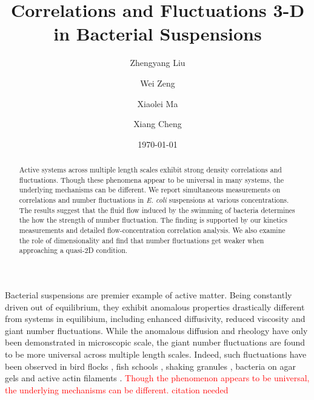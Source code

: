 \documentclass[twocolumn,aps,prl,amsmath,amssymb,longbibliography]{revtex4-1}
\begin{document}
\title{Correlations and Fluctuations 3-D in Bacterial Suspensions}

\author{Zhengyang Liu}
\author{Wei Zeng}
\author{Xiaolei Ma}
\author{Xiang Cheng}



\date{\today}


\begin{abstract}
Active systems across multiple length scales exhibit strong density correlations and fluctuations. Though these phenomena appear to be universal in many systems, the underlying mechanisms can be different. We report simultaneous measurements on correlations and number fluctuations in \textit{E. coli} suspensions at various concentrations. The results suggest that the fluid flow induced by the swimming of bacteria determines the how the strength of number fluctuation. The finding is supported by our kinetics measurements and detailed flow-concentration correlation analysis. We also examine the role of dimensionality and find that number fluctuations get weaker when approaching a quasi-2D condition.
\end{abstract}

\maketitle

Bacterial suspensions are premier example of active matter. Being constantly driven out of equilibrium, they exhibit anomalous properties drastically different from systems in equilibium, including enhanced diffusivity, reduced viscosity and giant number fluctuations. While the anomalous diffusion and rheology have only been demonstrated in microscopic scale, the giant number fluctuations are found to be more universal across multiple length scales. Indeed, such fluctuations have been observed in bird flocks \cite{Ballerini1232}, fish schools \cite{Ward6948}, shaking granules \cite{Narayan105}, bacteria on agar gels \cite{Zhang13626} and active actin filaments \cite{Schaller4488}. \textcolor{red}{Though the phenomenon appears to be universal, the underlying mechanisms can be different. citation needed}
\end{document}
